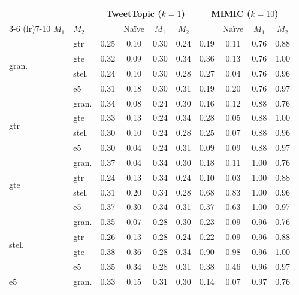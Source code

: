 \begin{table}[!t]
    \scriptsize
    \centering
    \begin{tabular}{llcccc|cccc}
        \toprule
        \multicolumn{2}{c}{} & \multicolumn{4}{c}{TweetTopic ($k=1$)} & \multicolumn{4}{c}{MIMIC ($k=10$)}\\
        \cmidrule(lr){3-6} \cmidrule(lr){7-10}
        $M_1$ & $M_2$ & \atk{} & Naïve & $M_1$ & $M_2$ & \atk{} & Naïve & $M_1$ & $M_2$ \\
        \midrule
        \multirow{4}{*}{gran.} & gtr & 0.25 & 0.10 & 0.30 & 0.24 & 0.19 & 0.11 & 0.76 & 0.88 \\
        & gte & 0.32 & 0.09 & 0.30 & 0.34 & 0.36 & 0.13 & 0.76 & 1.00 \\
        & stel. & 0.24 & 0.10 & 0.30 & 0.28 & 0.27 & 0.04 & 0.76 & 0.96 \\
        & e5 & 0.31 & 0.18 & 0.30 & 0.31 & 0.19 & 0.20 & 0.76 & 0.97 \\
        \midrule
        \multirow{4}{*}{gtr} & gran. & 0.34 & 0.08 & 0.24 & 0.30 & 0.16 & 0.12 & 0.88 & 0.76 \\
        & gte & 0.33 & 0.13 & 0.24 & 0.34 & 0.28 & 0.05 & 0.88 & 1.00 \\
        & stel. & 0.30 & 0.10 & 0.24 & 0.28 & 0.25 & 0.07 & 0.88 & 0.96 \\
        & e5 & 0.30 & 0.04 & 0.24 & 0.31 & 0.09 & 0.09 & 0.88 & 0.97 \\
        \midrule
        \multirow{4}{*}{gte} & gran. & 0.37 & 0.04 & 0.34 & 0.30 & 0.18 & 0.11 & 1.00 & 0.76 \\
        & gtr & 0.24 & 0.13 & 0.34 & 0.24 & 0.10 & 0.03 & 1.00 & 0.88 \\
        & stel. & 0.31 & 0.20 & 0.34 & 0.28 & 0.68 & 0.83 & 1.00 & 0.96 \\
        & e5 & 0.37 & 0.30 & 0.34 & 0.31 & 0.37 & 0.63 & 1.00 & 0.97 \\
        \midrule
        \multirow{4}{*}{stel.} & gran. & 0.35 & 0.07 & 0.28 & 0.30 & 0.23 & 0.09 & 0.96 & 0.76 \\
        & gtr & 0.26 & 0.13 & 0.28 & 0.24 & 0.22 & 0.09 & 0.96 & 0.88 \\
        & gte & 0.38 & 0.36 & 0.28 & 0.34 & 0.90 & 0.98 & 0.96 & 1.00 \\
        & e5 & 0.35 & 0.34 & 0.28 & 0.31 & 0.38 & 0.46 & 0.96 & 0.97 \\
        \midrule
        \multirow{4}{*}{e5} & gran. & 0.33 & 0.15 & 0.31 & 0.30 & 0.14 & 0.07 & 0.97 & 0.76 \\

\end{tabular}
\end{table}
